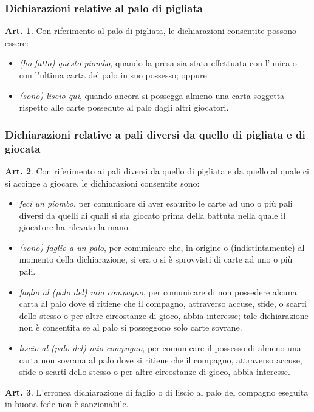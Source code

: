 \documentclass[italian,a4paper]{article}
\theoremstyle{definition}
\newtheorem{art}{Art.}
\newenvironment{packeditem}{
\begin{itemize}
  \setlength{\itemsep}{1pt}
  \setlength{\parskip}{0pt}
  \setlength{\parsep}{0pt}
}{\end{itemize}}
\begin{document}
\subsubsection{Dichiarazioni relative al palo di pigliata}
\begin{art}
    Con riferimento al palo di pigliata, le dichiarazioni consentite possono essere:
    \begin{packeditem}
\item      \emph{(ho fatto) questo piombo}, quando la presa sia stata effettuata con l'unica o con l'ultima carta del palo in suo possesso; oppure
\item      \emph{(sono) liscio qui}, quando ancora si possegga almeno una carta soggetta rispetto alle carte possedute al palo dagli altri giocatori.
    \end{packeditem}
\end{art}
\subsubsection{Dichiarazioni relative a pali diversi da quello di pigliata e
di giocata}
\begin{art}
    Con riferimento ai pali diversi da quello di pigliata e da quello al quale ci si accinge a giocare, le dichiarazioni consentite sono:
    \begin{packeditem}
\item      \emph{feci un piombo}, per comunicare di aver esaurito le carte ad uno o più pali diversi da quelli ai quali si sia giocato prima della battuta nella quale il giocatore ha rilevato la mano.
\item      \emph{(sono) faglio a un palo}, per comunicare che, in origine o (indistintamente) al momento della dichiarazione, si era o si è sprovvisti di carte ad uno o più pali.
\item      \emph{faglio al (palo del) mio compagno}, per comunicare di non possedere alcuna carta al palo dove si ritiene che il compagno, attraverso accuse, sfide, o scarti dello stesso o per altre circostanze di gioco, abbia interesse; tale dichiarazione non è consentita se al palo si posseggono solo carte sovrane.
\item      \emph{liscio al (palo del)  mio compagno}, per comunicare il possesso di almeno una carta non sovrana al palo dove si ritiene che il compagno, attraverso accuse, sfide o scarti dello stesso o per altre circostanze di gioco, abbia interesse.
    \end{packeditem}
\end{art}
\begin{art}
    L'erronea dichiarazione di faglio o di liscio al palo del compagno eseguita in buona fede non è sanzionabile.
\end{art}
\end{document}
